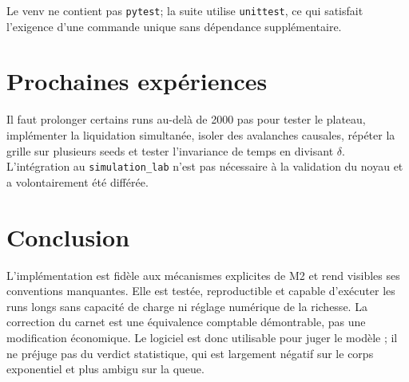 \documentclass[11pt,a4paper]{article}
\begin{document}
Le venv ne contient pas \texttt{pytest}; la suite utilise \texttt{unittest}, ce
qui satisfait l'exigence d'une commande unique sans dépendance supplémentaire.

\section{Prochaines expériences}

Il faut prolonger certains runs au-delà de 2000 pas pour tester le plateau,
implémenter la liquidation simultanée, isoler des avalanches causales, répéter la
grille sur plusieurs seeds et tester l'invariance de temps en divisant $\delta$.
L'intégration au \texttt{simulation\_lab} n'est pas nécessaire à la validation du
noyau et a volontairement été différée.

\section{Conclusion}

L'implémentation est fidèle aux mécanismes explicites de M2 et rend visibles ses
conventions manquantes. Elle est testée, reproductible et capable d'exécuter les
runs longs sans capacité de charge ni réglage numérique de la richesse. La
correction du carnet est une équivalence comptable démontrable, pas une
modification économique. Le logiciel est donc utilisable pour juger le modèle ;
il ne préjuge pas du verdict statistique, qui est largement négatif sur le corps
exponentiel et plus ambigu sur la queue.
\end{document}
